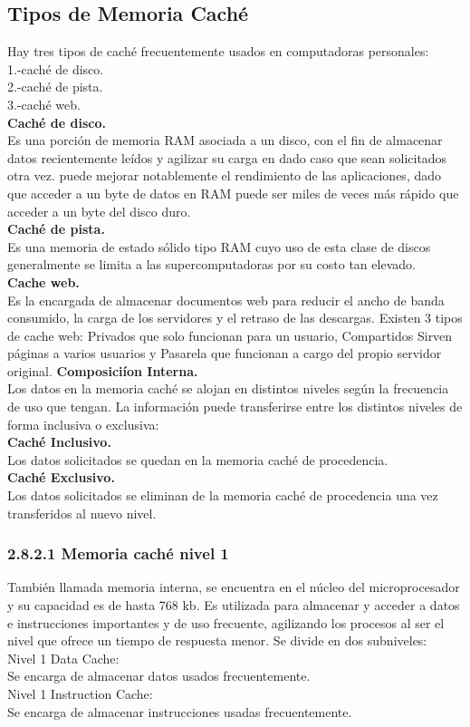\subsection{Tipos de Memoria Caché}
Hay tres tipos de caché frecuentemente usados en computadoras personales: \\ 1.-caché de disco.\\ 2.-caché de pista.\\ 3.-caché web.\\ {\bf Caché de disco.\\}
Es una porción de memoria RAM asociada a un disco, con el fin de almacenar datos recientemente leídos y agilizar su carga en dado caso que sean solicitados otra vez. puede mejorar notablemente el rendimiento de las aplicaciones, dado que acceder a un byte de datos en RAM puede ser miles de veces más rápido que acceder a un byte del disco duro.\\
{\bf Caché de pista.\\}
Es una memoria de estado sólido tipo RAM cuyo uso de esta clase de discos generalmente se limita a las supercomputadoras por su costo tan elevado.\\
{\bf Cache web.\\}
Es la encargada de almacenar documentos web para reducir el ancho de banda consumido, la carga de los servidores y el retraso de las descargas. Existen 3 tipos de cache web: Privados que solo funcionan para un usuario, Compartidos Sirven páginas a varios usuarios y Pasarela que funcionan a cargo del propio servidor original. 
{\bf Composiciíon Interna.\\}
Los datos en la memoria caché se alojan en distintos niveles según la frecuencia de uso que tengan. La información puede transferirse entre los distintos niveles de forma inclusiva o exclusiva:\\
{\bf Caché Inclusivo.\\}
Los datos solicitados se quedan en la memoria caché de procedencia.\\
{\bf Caché Exclusivo.\\}
Los datos solicitados se eliminan de la memoria caché de procedencia una vez transferidos al nuevo nivel.\\
\subsubsection{2.8.2.1 Memoria caché nivel 1}
También llamada memoria interna, se encuentra en el núcleo del microprocesador y su capacidad es de hasta 768 kb. Es utilizada para almacenar y acceder a datos e instrucciones importantes y de uso frecuente, agilizando los procesos al ser el nivel que ofrece un tiempo de respuesta menor. Se divide en dos subniveles:\\
Nivel 1 Data Cache:\\ Se encarga de almacenar datos usados frecuentemente.\\
Nivel 1 Instruction Cache:\\ Se encarga de almacenar instrucciones usadas frecuentemente.
